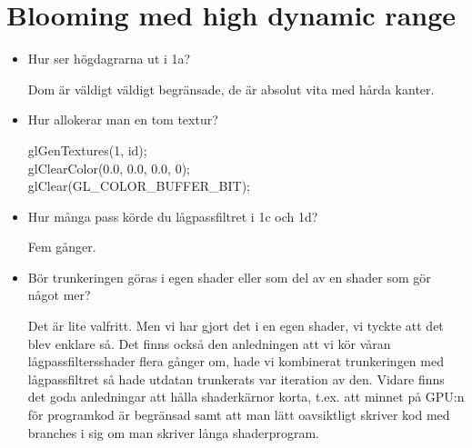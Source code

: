 \documentclass[a4paper,12pt]{article}
\begin{document}
\section{Blooming med high dynamic range}

\begin{itemize}
  \item Hur ser högdagrarna ut i 1a?

    Dom är väldigt väldigt begränsade, de är absolut vita med hårda kanter.

  \item Hur allokerar man en tom textur?

    glGenTextures(1, id);\\
    glClearColor(0.0, 0.0, 0.0, 0);\\
    glClear(GL\_COLOR\_BUFFER\_BIT);

  \item Hur många pass körde du lågpassfiltret i 1c och 1d?

    Fem gånger.

  \item Bör trunkeringen göras i egen shader eller som del av en shader som gör något mer?

    Det är lite valfritt. Men vi har gjort det i en egen shader, vi tyckte att det blev enklare så. Det finns också den anledningen att vi kör våran lågpassfiltersshader flera gånger om, hade vi kombinerat trunkeringen med lågpassfiltret så hade utdatan trunkerats var iteration av den. Vidare finns det goda anledningar att hålla shaderkärnor korta, t.ex. att minnet på GPU:n för programkod är begränsad samt att man lätt oavsiktligt skriver kod med branches i sig om man skriver långa shaderprogram.

\end{itemize}
\end{document}
